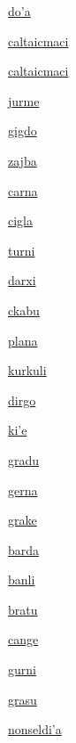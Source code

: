 {\hyperlink{val:doha}{do'a}}{}{}{}

{\hyperlink{val:caltaicmaci}{caltaicmaci}}{}{}{}

{\hyperlink{val:caltaicmaci}{caltaicmaci}}{}{}{}

{\hyperlink{val:jurme}{jurme}}{}{}{}

{\hyperlink{val:gigdo}{gigdo}}{}{}{}

{\hyperlink{val:zajba}{zajba}}{}{}{}

{\hyperlink{val:carna}{carna}}{}{}{}

{\hyperlink{val:cigla}{cigla}}{}{}{}

{\hyperlink{val:turni}{turni}}{}{}{}

{\hyperlink{val:darxi}{darxi}}{}{}{}

{\hyperlink{val:ckabu}{ckabu}}{}{}{}

{\hyperlink{val:plana}{plana}}{}{}{}

{\hyperlink{val:kurkuli}{kurkuli}}{}{}{}

{\hyperlink{val:dirgo}{dirgo}}{}{}{}

{\hyperlink{val:kihe}{ki'e}}{}{}{}

{\hyperlink{val:gradu}{gradu}}{}{}{}

{\hyperlink{val:gerna}{gerna}}{}{}{}

{\hyperlink{val:grake}{grake}}{}{}{}

{\hyperlink{val:barda}{barda}}{}{}{}

{\hyperlink{val:banli}{banli}}{}{}{}

{\hyperlink{val:bratu}{bratu}}{}{}{}

{\hyperlink{val:cange}{cange}}{}{}{}

{\hyperlink{val:gurni}{gurni}}{}{}{}

{\hyperlink{val:grasu}{grasu}}{}{}{}

{\hyperlink{val:nonseldiha}{nonseldi'a}}{}{}{}

